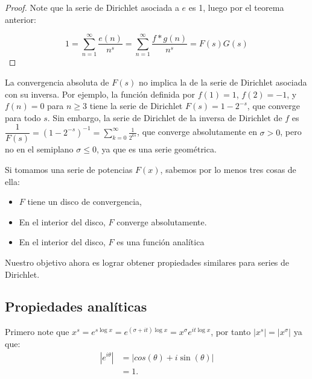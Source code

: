 \begin{proof}
Note que la serie de Dirichlet asociada a $e$ es 1, luego por el teorema anterior:

$$1=\sum_{n=1}^{\infty} \frac{e(n)}{n^s}=\sum_{n=1}^{\infty} \frac{f*g(n)}{n^s}=F(s)G(s)$$
\end{proof}

\begin{note}
La convergencia absoluta de \( F(s) \) no implica la de la serie de Dirichlet asociada con su inversa. Por ejemplo, la función definida por \( f(1)=1 \), \( f(2)=-1 \), y \( f(n)=0 \) para \( n \geq 3 \) tiene la serie de Dirichlet \( F(s)=1-2^{-s} \), que converge para todo $s$. Sin embargo, la serie de Dirichlet de la inversa de Dirichlet de \( f \) es \( \dfrac{1}{F(s)} = (1-2^{-s})^{-1} = \displaystyle\sum_{k=0}^{\infty} \frac{1}{2^{ks}} \), que converge absolutamente en \( \sigma > 0 \), pero no en el semiplano \( \sigma \leq 0 \), ya que es una serie geométrica. \cite{hildebrand2006introduction}\\
\end{note}

Si tomamos una serie de potencias $F(x)$, sabemos por lo menos tres cosas de ella:

\begin{itemize}[label=$\bullet$]
    \item $F$ tiene un disco de convergencia, 

    \item En el interior del disco, $F$ converge absolutamente.

    \item En el interior del disco, $F$ es una función analítica \cite{Apostol:105425}
\end{itemize}

Nuestro objetivo ahora es lograr obtener propiedades similares para series de Dirichlet.
\subsection{Propiedades analíticas}

Primero note que $\displaystyle x^{\displaystyle  s}=e^{\displaystyle s\log x}=e^{\displaystyle(\sigma+it)\log x}=x^{\displaystyle\sigma}e^{\displaystyle it\log{x}}$, por tanto $|\displaystyle x^{\displaystyle s}|=|x^{\displaystyle\sigma}|$ ya que:
\begin{align*}
     \left|e^{ i\theta}\right|&=|cos(\theta)+i\sin(\theta)|\\
     &=1
 .\end{align*} 

